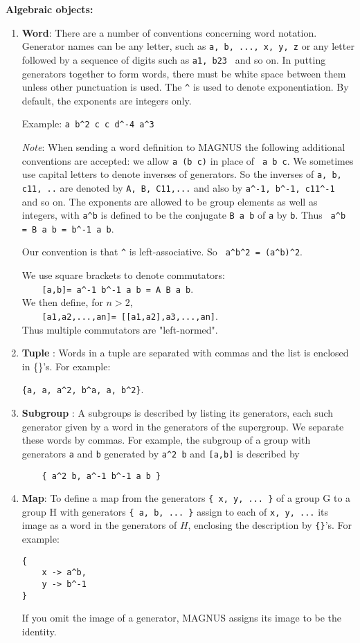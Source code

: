 \documentclass[12pt]{article}
\def\magnus{MAGNUS }
\begin{document}
\textbf{ Algebraic objects:}
\begin{enumerate}
\item \textbf{Word}:
There are a number of conventions concerning word notation.
Generator names can be any letter, such as
\verb+a, b, ..., x, y, z+
or any letter followed by a sequence of digits such as
\verb+a1, b23 +
and so on. In putting generators together to form words, there
must be white space between them unless other punctuation is
used. The \verb+^+ is used to denote exponentiation. By default, the
exponents are integers only.

Example: \verb+a b^2 c c d^-4 a^3+

{\em Note}: When sending a word definition to \magnus the
following additional conventions are accepted: we allow \verb+a (b c)+
in place of \verb+ a b c+. We sometimes use capital letters to denote
inverses of generators. So the inverses of \verb+a, b, c11, ..+ are
denoted by \verb+A, B, C11,...+ and also by \verb+a^-1, b^-1, c11^-1 +and so
on.  The exponents are allowed to be group elements as well as
integers, with \verb+a^b+ is defined to be the conjugate \verb+B a b+ of
\verb+a+ by \verb+b+.
Thus \verb+ a^b = B a b = b^-1 a b+.

Our convention is that \verb+^+ is left-associative. So
\verb+ a^b^2 = (a^b)^2+.

We use square brackets to denote commutators:\\
\verb+    [a,b]= a^-1 b^-1 a b = A B a b+.\\
We then define, for $n > 2$, \\
\verb+    [a1,a2,...,an]= [[a1,a2],a3,...,an]+.\\
Thus multiple commutators are "left-normed".

\item \textbf{Tuple} :
Words in a tuple are separated  with
commas and the list is enclosed in \{\}'s. For
example:

\verb+{a, a, a^2, b^a, a, b^2}+.


\item \textbf{Subgroup} :
A subgroups is described by listing its generators, each such
generator given by a word in the generators of the supergroup. We
separate these words by commas. For example, the subgroup of a
group with generators \verb+a+ and \verb+b+ generated
by \verb+a^2 b+ and \verb+[a,b]+ is
described by

\verb+    { a^2 b, a^-1 b^-1 a b }+


\item \textbf{ Map}:
To define a map from the generators
\verb+{ x, y, ... }+
of a group G to a group H with generators
\verb+{ a, b, ... }+
assign to each of \verb+x, y, ...+ its image as a word in the generators
of $H$, enclosing the description by \verb+{}+'s. For example:
\begin{verbatim}
{
    x -> a^b,
    y -> b^-1
}
\end{verbatim}
If you omit the image of a generator, \magnus assigns its image to
be the identity.


\end{enumerate}
\end{document}
